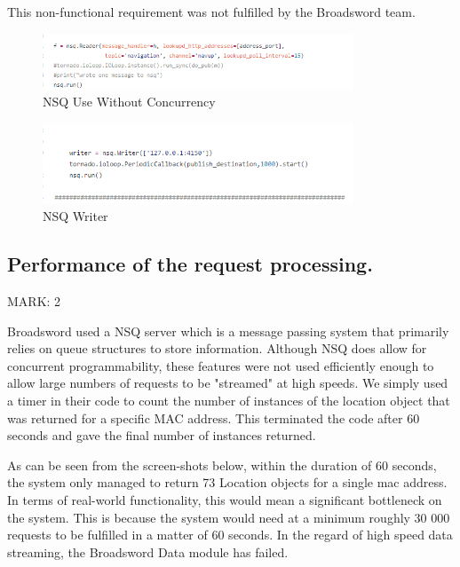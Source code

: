\documentclass{article}
\begin{document}
\begin{flushleft}
This non-functional requirement was not fulfilled by the Broadsword team.
\end{flushleft}

\begin{figure}[ht]
  \includegraphics[width=350px]{Images/concurrency.PNG}
  \caption{NSQ Use Without Concurrency}
  \label{NSQ Use Without Concurrency}
\end{figure}

\begin{figure}[ht]
  \includegraphics[width=350px]{Images/concurrency2.PNG}
  \caption{NSQ Writer}
  \label{NSQ Writer}
\end{figure}

\subsection{Performance of the request processing.}
\begin{flushleft}
MARK: 2
\end{flushleft}

\begin{flushleft}
Broadsword used a NSQ server which is a message passing system that primarily relies on queue structures to store information. Although NSQ does allow for concurrent programmability, these features were not used efficiently enough to allow large numbers of requests to be "streamed" at high speeds. We simply used a timer in their code to count the number of instances of the location object that was returned for a specific MAC address. This terminated the code after 60 seconds and gave the final number of instances returned.   
\end{flushleft}

\begin{flushleft}
As can be seen from the screen-shots below, within the duration of 60 seconds, the system only managed to return 73 Location objects for a single mac address. In terms of real-world functionality, this would mean a significant bottleneck on the system. This is because the system would need at a minimum roughly 30 000 requests to be fulfilled in a matter of 60 seconds. In the regard of high speed data streaming, the Broadsword Data module has failed.
\end{flushleft}
\end{document}
